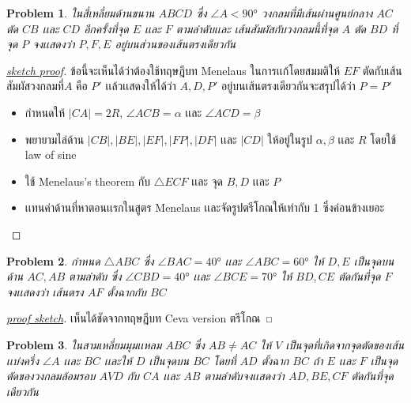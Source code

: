 \documentclass[a4paper,12pt]{article}
\newtheorem{problem}{Problem}[section]
\begin{document}
		\begin{problem}
			ในสี่เหลี่ยมด้านขนาน $ABCD$ ซึ่ง $\angle{A}<\ang{90}$ วงกลมที่มีเส้นผ่านศูนย์กลาง $AC$ ตัด $CB$ เเละ $CD$ อีกครั้งที่จุด $E$ เเละ $F$ ตามลำดับเเละ เส้นสัมผัสกับวงกลมนี้ที่จุด $A$ ตัด $BD$ ที่จุด $P$ จงเเสดงว่า $P,F,E$ อยู่บนส่วนของเส้นตรงเดียวกัน
		\end{problem}
		\begin{proof}[\underline{sketch proof}]
			ข้อนี้จะเห็นได้ว่าต้องใช้ทฤษฎีบท Menelaus ในการเเก้โดยสมมติให้ $EF$ ตัดกับเส้นสัมผัสวงกลมที่$A$ คือ $P'$ เเล้วเเสดงให้ได้ว่า $A,D,P'$ อยู่บนเส้นตรงเดียวกันจะสรุปได้ว่า $P=P'$
			\begin{itemize}
				\item กำหนดให้ $|CA| = 2R$, $\angle{ACB} = \alpha$ เเละ $\angle{ACD} = \beta$
				\item พยายามไล่ด้าน $|CB|, |BE|, |EF|, |FP|, |DF|$ เเละ $|CD|$ ให้อยู่ในรูป $\alpha, \beta$ เเละ $R$ โดยใช้ law of sine
				\item ใช้ Menelaus's theorem กับ $\bigtriangleup{ECF}$ เเละ จุด $B, D$ เเละ $P$
				\item เเทนค่าด้านที่หาตอนเเรกในสูตร Menelaus เเละจัดรูปตรีโกณให้เท่ากับ 1 ซึ่งค่อนข้างเยอะ
			\end{itemize}
			
		\end{proof}
		\begin{problem}
			กำหนด $\bigtriangleup{ABC}$ ซึ่ง $\angle{BAC} = \ang{40}$ เเละ $\angle{ABC} = \ang{60}$ ให้ $D, E$ เป็นจุดบนด้าน $AC, AB$ ตามลำดับ ซึ่ง $\angle{CBD} = \ang{40}$ เเละ $\angle{BCE} = \ang{70}$ ให้ $BD, CE$ ตัดกันที่จุด $F$ จงเเสดงว่า เส้นตรง $AF$ ตั้งฉากกับ $BC$
		\end{problem}
		\begin{proof}[\underline{proof sketch}]
			เห็นได้ชัดจากทฤษฎีบท Ceva version ตรีโกณ
		\end{proof}
		\newpage
		\begin{problem}
			ในสามเหลี่ยมมุมเเหลม $ABC$ ซึ่ง $AB \neq AC$ ให้ $V$ เป็นจุดที่เกิดจากจุดตัดของเส้นเเบ่งครึ่ง $\angle{A}$ เเละ $BC$ เเละให้ $D$ เป็นจุดบน $BC$ โดยที่ $AD$ ตั้งฉาก $BC$ ถ้า $E$ เเละ $F$ เป็นจุดตัดของวงกลมล้อมรอบ $AVD$ กับ $CA$ เเละ $AB$ ตามลำดับจงเเสดงว่า $AD,BE,CF$ ตัดกันที่จุดเดียวกัน
		\end{problem}
\end{document}
